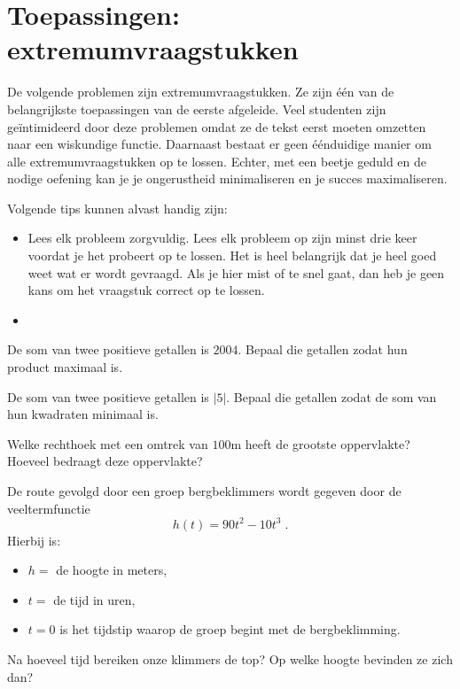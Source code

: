 \documentclass[12pt]{article}
\begin{document}
\pagebreak
\section{Toepassingen: extremumvraagstukken}

De volgende problemen zijn extremumvraagstukken. Ze zijn één van de belangrijkste toepassingen van de eerste afgeleide. Veel studenten zijn geïntimideerd door deze problemen omdat ze de tekst eerst moeten omzetten naar een wiskundige functie. Daarnaast bestaat er geen éénduidige manier om alle extremumvraagstukken op te lossen. Echter, met een beetje geduld en de nodige oefening kan je je ongerustheid minimaliseren en je succes maximaliseren.

Volgende tips kunnen alvast handig zijn:
\begin{itemize}
\item Lees elk probleem zorgvuldig. Lees elk probleem op zijn minst drie keer voordat je het probeert op te lossen. Het is heel belangrijk dat je heel goed weet wat er wordt gevraagd. Als je hier mist of te snel gaat, dan heb je geen kans om het vraagstuk correct op te lossen.
\item
\end{itemize}

\begin{oefening}
  De som van twee positieve getallen is $2004$. Bepaal die getallen zodat hun product maximaal is.
\end{oefening}

\begin{oefening}
  De som van twee positieve getallen is $|5|$. Bepaal die getallen zodat de som van hun kwadraten minimaal is.
\end{oefening}

\begin{oefening}
  Welke rechthoek met een omtrek van $100$m heeft de grootste oppervlakte? Hoeveel bedraagt deze oppervlakte?
\end{oefening}

\begin{oefening}
  De route gevolgd door een groep bergbeklimmers wordt gegeven door de veeltermfunctie
  $$h(t)=90t^2-10t^3\;.$$
  Hierbij is:
  \begin{itemize}
  \item $h=$ de hoogte in meters,
  \item $t=$ de tijd in uren,
  \item $t=0$ is het tijdstip waarop de groep begint met de bergbeklimming.
  \end{itemize}
  Na hoeveel tijd bereiken onze klimmers de top? Op welke hoogte bevinden ze zich dan?
\end{oefening}
\end{document}
